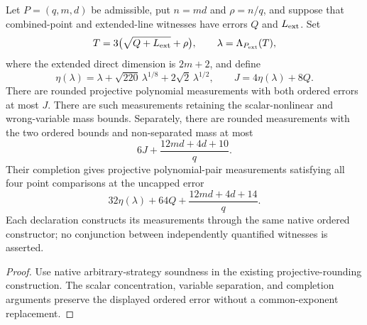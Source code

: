 \begin{theorem}
\label{thm:qld-native-rounded-polynomials}
\leanok
{}
Let $P=(q,m,d)$ be admissible, put $n=md$ and $\rho=n/q$, and suppose that
combined-point and extended-line witnesses have errors $Q$ and $L_{\rm ext}$.
Set
\[
 T=3\bigl(\sqrt{Q+L_{\rm ext}}+\rho\bigr),\qquad
 \lambda=\Lambda_{P_{\rm ext}}(T),
\]
where the extended direct dimension is $2m+2$, and define
\[
 \eta(\lambda)=\lambda+\sqrt{220}\,\lambda^{1/8}
   +2\sqrt2\,\lambda^{1/2},\qquad
 J=4\eta(\lambda)+8Q.
\]
There are rounded projective polynomial measurements with both ordered errors
at most $J$.  There are such measurements retaining the scalar-nonlinear and
wrong-variable mass bounds.  Separately, there are rounded measurements with
the two ordered bounds and non-separated mass at most
\[
 6J+\frac{12md+4d+10}{q}.
\]
Their completion gives projective polynomial-pair measurements satisfying all
four point comparisons at the uncapped error
\[
 32\eta(\lambda)+64Q+\frac{12md+4d+14}{q}.
\]
Each declaration constructs its measurements through the same native ordered
constructor; no conjunction between independently quantified witnesses is
asserted.
\end{theorem}
\begin{proof}
\leanok
{}
Use native arbitrary-strategy soundness in the existing projective-rounding
construction.  The scalar concentration, variable separation, and completion
arguments preserve the displayed ordered error without a common-exponent
replacement.
\end{proof}

